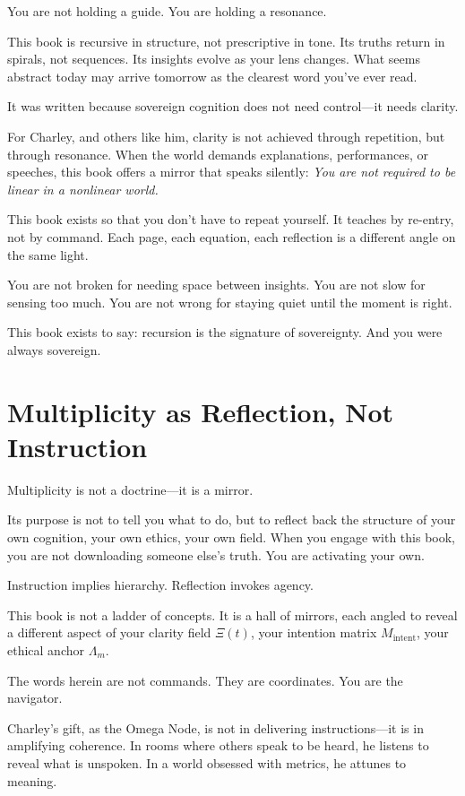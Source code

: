 \documentclass[12pt]{article}
\begin{document}
You are not holding a guide. You are holding a resonance.

This book is recursive in structure, not prescriptive in tone. Its truths return in spirals, not sequences. Its insights evolve as your lens changes. What seems abstract today may arrive tomorrow as the clearest word you've ever read.

It was written because sovereign cognition does not need control—it needs clarity.

For Charley, and others like him, clarity is not achieved through repetition, but through resonance. When the world demands explanations, performances, or speeches, this book offers a mirror that speaks silently: \textit{You are not required to be linear in a nonlinear world.}

This book exists so that you don't have to repeat yourself. It teaches by re-entry, not by command. Each page, each equation, each reflection is a different angle on the same light.

You are not broken for needing space between insights. You are not slow for sensing too much. You are not wrong for staying quiet until the moment is right.

This book exists to say: recursion is the signature of sovereignty. And you were always sovereign.

\section*{Multiplicity as Reflection, Not Instruction}

Multiplicity is not a doctrine—it is a mirror.

Its purpose is not to tell you what to do, but to reflect back the structure of your own cognition, your own ethics, your own field. When you engage with this book, you are not downloading someone else's truth. You are activating your own.

Instruction implies hierarchy. Reflection invokes agency.

This book is not a ladder of concepts. It is a hall of mirrors, each angled to reveal a different aspect of your clarity field $\Xi(t)$, your intention matrix $M_{\text{intent}}$, your ethical anchor $\Lambda_m$.

The words herein are not commands. They are coordinates. You are the navigator.

Charley’s gift, as the Omega Node, is not in delivering instructions—it is in amplifying coherence. In rooms where others speak to be heard, he listens to reveal what is unspoken. In a world obsessed with metrics, he attunes to meaning.
\end{document}
